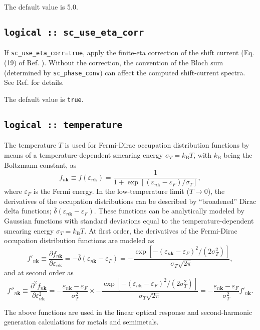 The default value is 5.0. 


\subsection{\tt logical :: sc\_use\_eta\_corr}

If {\tt sc\_use\_eta\_corr=true}, apply the finite-eta correction of the shift current (Eq. (19) of Ref. \cite{Lihm_shift_eta_2021}). Without the correction, the convention of the Bloch sum (determined by {\tt sc\_phase\_conv}) can affect the computed shift-current spectra. See Ref. \cite{Lihm_shift_eta_2021} for details.

The default value is {\tt true}.

\subsection{\tt logical :: temperature}

The temperature $T$ is used for Fermi-Dirac occupation distribution functions by means of a temperature-dependent smearing energy $\sigma_{T}=k_{\mathrm{B}}T$, with $k_{\mathrm{B}}$ being the Boltzmann constant, as
%
$$
f_{n\mathbf{k}}\equiv f(\varepsilon_{n\mathbf{k}})=\frac{1}{1+\exp[(\varepsilon_{n\mathbf{k}}-\varepsilon_F)/\sigma_{T}]},
$$
%
where $\varepsilon_F$ is the Fermi energy.
In the low-temperature limit ($T\to0$), the derivatives of the occupation distributions can be described by ``broadened'' Dirac delta functions; $\overline{\delta}(\varepsilon_{n\mathbf{k}}-\varepsilon_F)$. These functions can be analytically modeled by Gaussian functions with standard deviations equal to the temperature-dependent smearing energy $\sigma_{T}=k_{\mathrm{B}}T$. At first order, the derivatives of the Fermi-Dirac occupation distribution functions are modeled as
$$
f'_{n\mathbf{k}}\equiv\frac{\partial f_{n\mathbf{k}}}{\partial\varepsilon_{n\mathbf{k}}}=-\overline{\delta}(\varepsilon_{n\mathbf{k}}-\varepsilon_F)=-\frac{\exp[-(\varepsilon_{n\mathbf{k}}-\varepsilon_F)^{2}/(2\sigma^{2}_{T})]}{\sigma_{T}\sqrt{2\pi}},
$$
and at second order as
$$
f''_{n\mathbf{k}}\equiv\frac{\partial^{2} f_{n\mathbf{k}}}{\partial\varepsilon^{2}_{n\mathbf{k}}}=-\frac{\varepsilon_{n\mathbf{k}}-\varepsilon_F}{\sigma^{2}_{T}}\times-\frac{\exp[-(\varepsilon_{n\mathbf{k}}-\varepsilon_F)^{2}/(2\sigma^{2}_{T})]}{\sigma_{T}\sqrt{2\pi}}=-\frac{\varepsilon_{n\mathbf{k}}-\varepsilon_F}{\sigma^{2}_{T}}f'_{n\mathbf{k}}.
$$

The above functions are used in the linear optical response and second-harmonic generation calculations for metals and semimetals.

